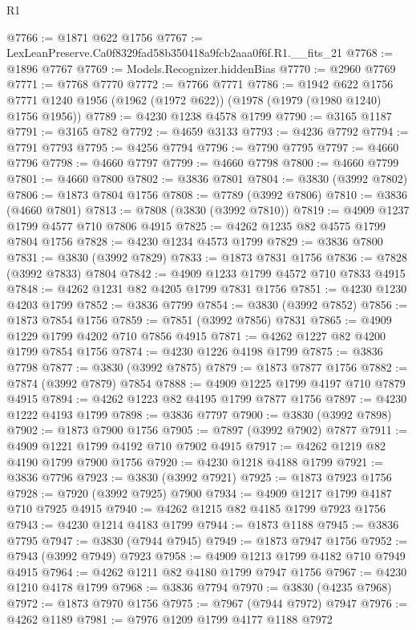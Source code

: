 \begin{lexlean}{R1}
\begin{coremodule}
@7766 := @1871 @622 @1756
@7767 := LexLeanPreserve.Ca0f8329fad58b350418a9fcb2aaa0f6f.R1.__fits_21
@7768 := @1896 @7767
@7769 := Models.Recognizer.hiddenBias
@7770 := @2960 @7769
@7771 := @7768 @7770
@7772 := @7766 @7771
@7786 := @1942
    @622
    @1756
    @7771
    @1240
    @1956
    (@1962 (@1972 @622))
    (@1978 (@1979 (@1980 @1240) @1756 @1956))
@7789 := @4230 @1238 @4578 @1799
@7790 := @3165 @1187
@7791 := @3165 @782
@7792 := @4659 @3133
@7793 := @4236 @7792
@7794 := @7791 @7793
@7795 := @4256 @7794
@7796 := @7790 @7795
@7797 := @4660 @7796
@7798 := @4660 @7797
@7799 := @4660 @7798
@7800 := @4660 @7799
@7801 := @4660 @7800
@7802 := @3836 @7801
@7804 := @3830 (@3992 @7802)
@7806 := @1873 @7804 @1756
@7808 := @7789 (@3992 @7806)
@7810 := @3836 (@4660 @7801)
@7813 := @7808 (@3830 (@3992 @7810))
@7819 := @4909 @1237 @1799 @4577 @710 @7806 @4915
@7825 := @4262 @1235 @82 @4575 @1799 @7804 @1756
@7828 := @4230 @1234 @4573 @1799
@7829 := @3836 @7800
@7831 := @3830 (@3992 @7829)
@7833 := @1873 @7831 @1756
@7836 := @7828 (@3992 @7833) @7804
@7842 := @4909 @1233 @1799 @4572 @710 @7833 @4915
@7848 := @4262 @1231 @82 @4205 @1799 @7831 @1756
@7851 := @4230 @1230 @4203 @1799
@7852 := @3836 @7799
@7854 := @3830 (@3992 @7852)
@7856 := @1873 @7854 @1756
@7859 := @7851 (@3992 @7856) @7831
@7865 := @4909 @1229 @1799 @4202 @710 @7856 @4915
@7871 := @4262 @1227 @82 @4200 @1799 @7854 @1756
@7874 := @4230 @1226 @4198 @1799
@7875 := @3836 @7798
@7877 := @3830 (@3992 @7875)
@7879 := @1873 @7877 @1756
@7882 := @7874 (@3992 @7879) @7854
@7888 := @4909 @1225 @1799 @4197 @710 @7879 @4915
@7894 := @4262 @1223 @82 @4195 @1799 @7877 @1756
@7897 := @4230 @1222 @4193 @1799
@7898 := @3836 @7797
@7900 := @3830 (@3992 @7898)
@7902 := @1873 @7900 @1756
@7905 := @7897 (@3992 @7902) @7877
@7911 := @4909 @1221 @1799 @4192 @710 @7902 @4915
@7917 := @4262 @1219 @82 @4190 @1799 @7900 @1756
@7920 := @4230 @1218 @4188 @1799
@7921 := @3836 @7796
@7923 := @3830 (@3992 @7921)
@7925 := @1873 @7923 @1756
@7928 := @7920 (@3992 @7925) @7900
@7934 := @4909 @1217 @1799 @4187 @710 @7925 @4915
@7940 := @4262 @1215 @82 @4185 @1799 @7923 @1756
@7943 := @4230 @1214 @4183 @1799
@7944 := @1873 @1188
@7945 := @3836 @7795
@7947 := @3830 (@7944 @7945)
@7949 := @1873 @7947 @1756
@7952 := @7943 (@3992 @7949) @7923
@7958 := @4909 @1213 @1799 @4182 @710 @7949 @4915
@7964 := @4262 @1211 @82 @4180 @1799 @7947 @1756
@7967 := @4230 @1210 @4178 @1799
@7968 := @3836 @7794
@7970 := @3830 (@4235 @7968)
@7972 := @1873 @7970 @1756
@7975 := @7967 (@7944 @7972) @7947
@7976 := @4262 @1189
@7981 := @7976 @1209 @1799 @4177 @1188 @7972

\end{coremodule}
\end{lexlean}
